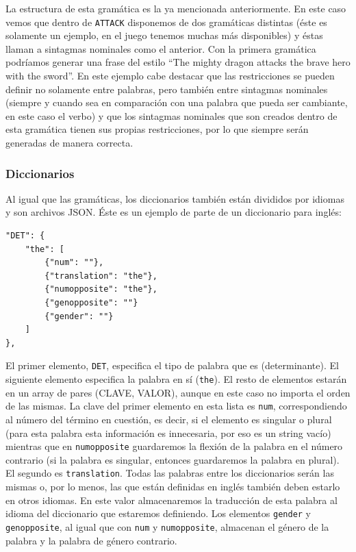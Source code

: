 \noindent La estructura de esta gramática es la ya mencionada anteriormente. En este caso vemos que dentro de \texttt{ATTACK} disponemos de dos gramáticas distintas (éste es solamente un ejemplo, en el juego tenemos muchas más disponibles) y éstas llaman a sintagmas nominales como el anterior.
Con la primera gramática podríamos generar una frase del estilo ``The mighty dragon attacks the brave hero with the sword''. En este ejemplo cabe destacar que las restricciones se pueden definir no solamente entre palabras, pero también entre sintagmas nominales (siempre y cuando sea en comparación con una palabra que pueda ser cambiante, en este caso el verbo) y que los sintagmas nominales que son creados dentro de esta gramática tienen sus propias restricciones, por lo que siempre serán generadas de manera correcta.

\subsubsection{Diccionarios}

Al igual que las gramáticas, los diccionarios también están divididos por idiomas y son archivos JSON. Éste es un ejemplo de parte de un diccionario para inglés:

\begin{lstlisting}[style=json]
"DET": {
    "the": [
        {"num": ""},
        {"translation": "the"},
        {"numopposite": "the"},
        {"genopposite": ""}
        {"gender": ""}
    ]
},
\end{lstlisting}

\noindent El primer elemento, \texttt{DET}, especifica el tipo de palabra que es (determinante). El siguiente elemento especifica la palabra en sí (\texttt{the}). El resto de elementos estarán en un array de pares (CLAVE, VALOR), aunque en este caso no importa el orden de las mismas. La clave del primer elemento en esta lista es \texttt{num}, correspondiendo al número del término en cuestión, es decir, si el elemento es singular o plural (para esta palabra esta información es innecesaria, por eso es un string vacío) mientras que en \texttt{numopposite} guardaremos la flexión de la palabra en el número contrario (si la palabra es singular, entonces guardaremos la palabra en plural).
El segundo es \texttt{translation}. Todas las palabras entre los diccionarios serán las mismas o, por lo menos, las que están definidas en inglés también deben estarlo en otros idiomas. En este valor almacenaremos la traducción de esta palabra al idioma del diccionario que estaremos definiendo.
Los elementos \texttt{gender} y \texttt{genopposite}, al igual que con \texttt{num} y \texttt{numopposite}, almacenan el género de la palabra y la palabra de género contrario.

